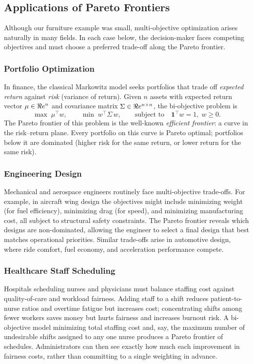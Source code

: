 \subsection{Applications of Pareto Frontiers}

Although our furniture example was small, multi-objective optimization arises naturally in many fields.  In each case below, the decision-maker faces competing objectives and must choose a preferred trade-off along the Pareto frontier.

\subsubsection{Portfolio Optimization}
In finance, the classical Markowitz model seeks portfolios that trade off \emph{expected return} against \emph{risk} (variance of return).  Given $n$ assets with expected return vector $\mu \in \Re e^n$ and covariance matrix $\Sigma \in \Re e^{n \times n}$, the bi-objective problem is
\[
\max \; \mu^\top w, \qquad \min \; w^\top \Sigma\, w, \qquad \text{subject to} \quad \mathbf{1}^\top w = 1, \; w \geq 0.
\]
The Pareto frontier of this problem is the well-known \emph{efficient frontier}: a curve in the risk--return plane.  Every portfolio on this curve is Pareto optimal; portfolios below it are dominated (higher risk for the same return, or lower return for the same risk).

\subsubsection{Engineering Design}
Mechanical and aerospace engineers routinely face multi-objective trade-offs.  For example, in aircraft wing design the objectives might include minimizing weight (for fuel efficiency), minimizing drag (for speed), and minimizing manufacturing cost, all subject to structural safety constraints.  The Pareto frontier reveals which designs are non-dominated, allowing the engineer to select a final design that best matches operational priorities.  Similar trade-offs arise in automotive design, where ride comfort, fuel economy, and acceleration performance compete.

\subsubsection{Healthcare Staff Scheduling}
Hospitals scheduling nurses and physicians must balance staffing cost against quality-of-care and workload fairness.  Adding staff to a shift reduces patient-to-nurse ratios and overtime fatigue but increases cost; concentrating shifts among fewer workers saves money but hurts fairness and increases burnout risk.  A bi-objective model minimizing total staffing cost and, say, the maximum number of undesirable shifts assigned to any one nurse produces a Pareto frontier of schedules.  Administrators can then see exactly how much each improvement in fairness costs, rather than committing to a single weighting in advance.

